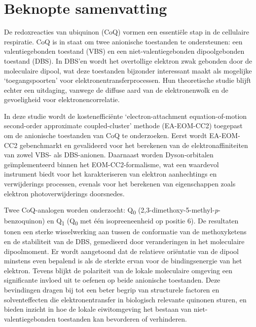 \chapter*{Beknopte samenvatting}


De redoxreacties van ubiquinon (CoQ) vormen een essentiële stap in de cellulaire respiratie. CoQ is in staat om twee anionische toestanden te ondersteunen: een valentiegebonden toestand (VBS) en een niet-valentiegebonden dipoolgebonden toestand (DBS). In DBS’en wordt het overtollige elektron zwak gebonden door de moleculaire dipool, wat deze toestanden bijzonder interessant maakt als mogelijke ‘toegangspoorten’ voor elektronentransferprocessen. Hun theoretische studie blijft echter een uitdaging, vanwege de diffuse aard van de elektronenwolk en de gevoeligheid voor elektronencorrelatie.

In deze studie wordt de kostenefficiënte `electron-attachment equation-of-motion second-order approximate coupled-cluster' methode (EA-EOM-CC2) toegepast om de anionische toestanden van CoQ te onderzoeken. Eerst wordt EA-EOM-CC2 gebenchmarkt en gevalideerd voor het berekenen van de elektronaffiniteiten van zowel VBS- als DBS-anionen. Daarnaast worden Dyson-orbitalen geïmplementeerd binnen het EOM-CC2-formalisme, wat een waardevol instrument biedt voor het karakteriseren van elektron aanhechtings en verwijderings processen, evenals voor het berekenen van eigenschappen zoals elektron photoverwijderings doorsnedes.

Twee CoQ-analogen worden onderzocht: Q\textsubscript{0} (2,3-dimethoxy-5-methyl-\textit{p}-benzoquinon) en Q\textsubscript{1} (Q\textsubscript{0} met één isopreeneenheid op positie 6). De resultaten tonen een sterke wisselwerking aan tussen de conformatie van de methoxyketens en de stabiliteit van de DBS, gemedieerd door veranderingen in het moleculaire dipoolmoment. Er wordt aangetoond dat de relatieve oriëntatie van de dipool minstens even bepalend is als de sterkte ervan voor de bindingsenergie van het elektron. Tevens blijkt de polariteit van de lokale moleculaire omgeving een significante invloed uit te oefenen op beide anionische toestanden. Deze bevindingen dragen bij tot een beter begrip van structurele factoren en solventeffecten die elektronentransfer in biologisch relevante quinonen sturen, en bieden inzicht in hoe de lokale eiwitomgeving het bestaan van niet-valentiegebonden toestanden kan bevorderen of verhinderen.

\cleardoublepage

